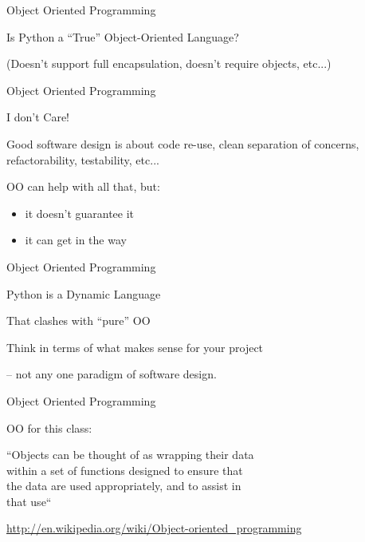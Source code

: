 \documentclass{beamer}
\begin{document}
\begin{frame}[fragile]{Object Oriented Programming}

\vfill
 {\LARGE Is Python a ``True'' Object-Oriented Language?}

\vfill
{\Large (Doesn't support full encapsulation, doesn't require objects, etc...)}

\end{frame} 

\begin{frame}[fragile]{Object Oriented Programming}

\vfill
 {\LARGE I don't Care!}

\vfill
{\Large Good software design is about code re-use, clean separation of concerns,
refactorability, testability, etc...}

\vfill
{\Large OO can help with all that, but:
\begin{itemize}
  \item it doesn't guarantee it
  \item it can get in the way
\end{itemize}
}

\end{frame} 

\begin{frame}[fragile]{Object Oriented Programming}

\vfill
 {\LARGE Python is a Dynamic Language}

\vfill
{\Large That clashes with ``pure'' OO}

\vfill
{\Large Think in terms of what makes sense for your project

 -- not any one paradigm of software design.
}


\end{frame} 

\begin{frame}[fragile]{Object Oriented Programming}

\vfill
 {\LARGE OO for this class:}

\vfill
{\Large 
``Objects can be thought of as wrapping their data \\[.03in]
within a set of functions designed to ensure that \\[.03in]
the data are used appropriately, and to assist in \\[.03in]
that use``
}

\vfill
{\small
\url{http://en.wikipedia.org/wiki/Object-oriented_programming}
}

\end{frame} 
\end{document}
